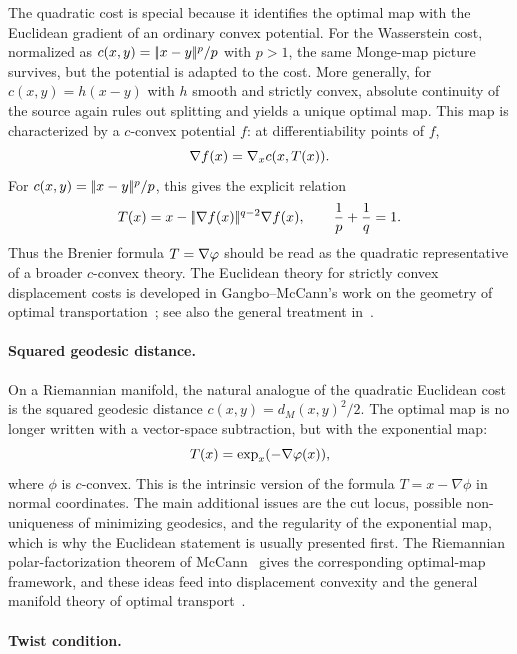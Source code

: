 The quadratic cost is special because it identifies the optimal map with the Euclidean gradient of an ordinary convex potential. For the Wasserstein cost, normalized as \(c(x,y)=|\!| x-y |\!|^p/p\) with \(p>1\), the same Monge-map picture survives, but the potential is adapted to the cost. More generally, for \(c(x,y)=h(x-y)\) with \(h\) smooth and strictly convex, absolute continuity of the source again rules out splitting and yields a unique optimal map. This map is characterized by a \(c\)-convex potential \(f\): at differentiability points of \(f\),
\[
	\nabla f(x)=\nabla_x c(x,T(x)).
\]
For \(c(x,y)=|\!| x-y |\!|^p/p\), this gives the explicit relation
\[
	T(x)=x-|\!| \nabla f(x) |\!|^{q-2}\nabla f(x),
	\qquad \frac1p+\frac1q=1.
\]
Thus the Brenier formula \(T=\nabla\varphi\) should be read as the quadratic representative of a broader \(c\)-convex theory. The Euclidean theory for strictly convex displacement costs is developed in Gangbo--McCann's work on the geometry of optimal transportation~\cite{gangbo1996geometry}; see also the general treatment in~\cite{Villani09}.

\paragraph{Squared geodesic distance.}

On a Riemannian manifold, the natural analogue of the quadratic Euclidean cost is the squared geodesic distance \(c(x,y)=d_M(x,y)^2/2\). The optimal map is no longer written with a vector-space subtraction, but with the exponential map:
	\[
		T(x)=\exp_x(-\nabla\varphi(x)),
	\]
	where \(\phi\) is \(c\)-convex. This is the intrinsic version of the formula \(T=x-\nabla\phi\) in normal coordinates. The main additional issues are the cut locus, possible non-uniqueness of minimizing geodesics, and the regularity of the exponential map, which is why the Euclidean statement is usually presented first. The Riemannian polar-factorization theorem of McCann~\cite{mccann2001polar} gives the corresponding optimal-map framework, and these ideas feed into displacement convexity and the general manifold theory of optimal transport~\cite{mccann1997convexity,Villani09}.

\paragraph{Twist condition.}

